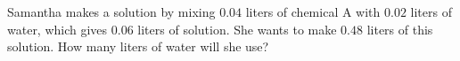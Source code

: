 Samantha makes a solution by mixing $0.04$ liters of chemical A with $0.02$ liters of water, which gives $0.06$ liters of solution. She wants to make $0.48$ liters of this solution. How many liters of water will she use?

